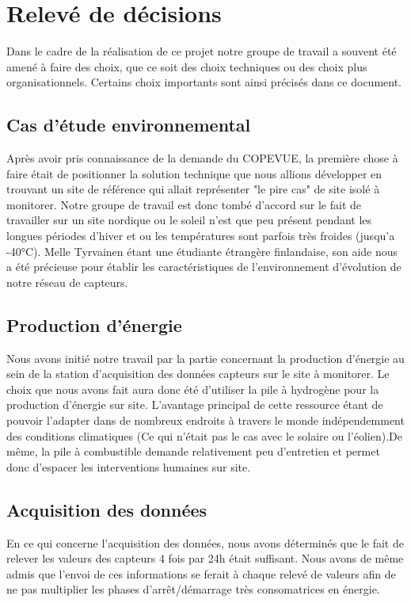 \section{Relevé de décisions}
Dans le cadre de la réalisation de ce projet notre groupe de travail a souvent été amené à faire des choix, que ce soit des choix techniques ou des choix plus organisationnels. Certains choix importants sont ainsi précisés dans ce document.
\subsection{Cas d'étude environnemental}
Après avoir pris connaissance de la demande du COPEVUE, la première chose à faire était de positionner la solution technique que nous allions développer en trouvant un site de référence qui allait représenter "le pire cas" de site isolé à monitorer. Notre groupe de travail est donc tombé d'accord sur le fait de travailler sur un site nordique ou le soleil n'est que peu présent pendant les longues périodes d'hiver et ou les températures sont parfois très froides (jusqu'a -40°C). Melle Tyrvainen étant une étudiante étrangère finlandaise, son aide nous a été précieuse pour établir les caractéristiques de l'environnement d'évolution de notre réseau de capteurs.
\medskip
\subsection{Production d'énergie}
Nous avons initié notre travail par la partie concernant la production d'énergie au sein de la station d'acquisition des données capteurs sur le site à monitorer. Le choix que nous avons fait aura donc été d'utiliser la pile à hydrogène pour la production d'énergie sur site. L'avantage principal de cette ressource étant de pouvoir l'adapter dans de nombreux endroits à travers le monde indépendemment des conditions climatiques (Ce qui n'était pas le cas avec le solaire ou l'éolien).De même, la pile à combustible demande relativement peu d'entretien et permet donc d'espacer les interventions humaines sur site.
\medskip
\subsection{Acquisition des données}
En ce qui concerne l'acquisition des données, nous avons déterminés que le fait de relever les valeurs des capteurs 4 fois par 24h était suffisant. Nous avons de même admis que l'envoi de ces informations se ferait à chaque relevé de valeurs afin de ne pas multiplier les phases d'arrêt/démarrage très consomatrices en énergie.
\medskip
